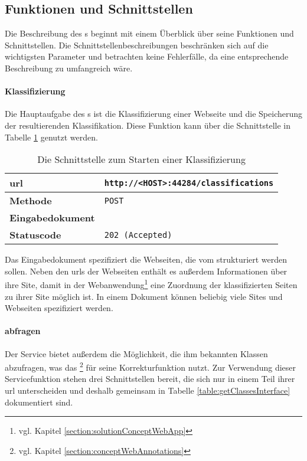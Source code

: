 \subsection{Funktionen und Schnittstellen}
    \label{section:solutionDetailsClassificationServiceFunctions}
    Die Beschreibung des {\classificationService}s beginnt mit einem
    Überblick über seine Funktionen und Schnittstellen.
    Die Schnittstellenbeschreibungen beschränken sich auf die wichtigsten
    Parameter und betrachten keine Fehlerfälle,
    da eine entsprechende Beschreibung zu umfangreich wäre.

    \paragraph{Klassifizierung}
    Die Hauptaufgabe des {\classificationService}s ist die Klassifizierung einer Webseite
    und die Speicherung der resultierenden Klassifikation.
    Diese Funktion kann über die Schnittstelle in Tabelle \ref{table:startClassificationInterface} genutzt werden.

    \begin{table}[htb]
        \centering
        \begin{tabular}{|l|l|}
        \hline
        \textbf{\gls{url}} & \texttt{http://<HOST>:44284/classifications}\\
        \hline
        \textbf{Methode} & \texttt{POST}\\
        \hline
        \textbf{Eingabedokument} & \\
        \hline
        \textbf{Statuscode} & \texttt{202 (Accepted)}\\
        \hline
        \end{tabular}
        \caption{Die Schnittstelle zum Starten einer Klassifizierung}
        \label{table:startClassificationInterface}
    \end{table}

    Das Eingabedokument spezifiziert die Webseiten,
    die vom {\classificationService} strukturiert werden sollen.
    Neben den \glspl{url} der Webseiten enthält es außerdem Informationen über ihre Site,
    damit in der Webanwendung\footnote{vgl. Kapitel \ref{section:solutionConceptWebApp}}
    eine Zuordnung der klassifizierten Seiten zu ihrer Site möglich ist.
    In einem Dokument können beliebig viele Sites und Webseiten spezifiziert werden.

    \paragraph{{\classificationModel} abfragen}
    Der Service bietet außerdem die Möglichkeit, die ihm bekannten Klassen abzufragen,
    was das {\annotatorPlugin}\footnote{vgl. Kapitel \ref{section:conceptWebAnnotations}}
    für seine Korrekturfunktion nutzt.
    Zur Verwendung dieser Servicefunktion stehen drei Schnittstellen bereit,
    die sich nur in einem Teil ihrer \gls{url} unterscheiden und deshalb gemeinsam in
    Tabelle \ref{table:getClassesInterface} dokumentiert sind.

